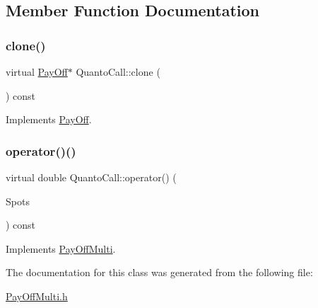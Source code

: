 \subsection{Member Function Documentation}
\hypertarget{classQuantoCall_a93f79639f06467ab145108dc15bba830}{}\label{classQuantoCall_a93f79639f06467ab145108dc15bba830} 
\subsubsection{\texorpdfstring{clone()}{clone()}}
{\footnotesize\ttfamily virtual \hyperlink{classPayOff}{Pay\+Off}$\ast$ Quanto\+Call\+::clone (\begin{DoxyParamCaption}{ }\end{DoxyParamCaption}) const\hspace{0.3cm}{\ttfamily [virtual]}}



Implements \hyperlink{classPayOff_ad8194d5b82247ae89c25c515f0ba806a}{Pay\+Off}.

\hypertarget{classQuantoCall_a4269b10b960c3d71cd01b4bd889534ae}{}\label{classQuantoCall_a4269b10b960c3d71cd01b4bd889534ae} 
\subsubsection{\texorpdfstring{operator()()}{operator()()}}
{\footnotesize\ttfamily virtual double Quanto\+Call\+::operator() (\begin{DoxyParamCaption}\item[{const \hyperlink{classMJArray}{M\+J\+Array} \&}]{Spots }\end{DoxyParamCaption}) const\hspace{0.3cm}{\ttfamily [virtual]}}



Implements \hyperlink{classPayOffMulti_a61039e0c0ee136842b5d6f340b9f8155}{Pay\+Off\+Multi}.



The documentation for this class was generated from the following file\+:\begin{DoxyCompactItemize}
\item 
\hyperlink{PayOffMulti_8h}{Pay\+Off\+Multi.\+h}\end{DoxyCompactItemize}
